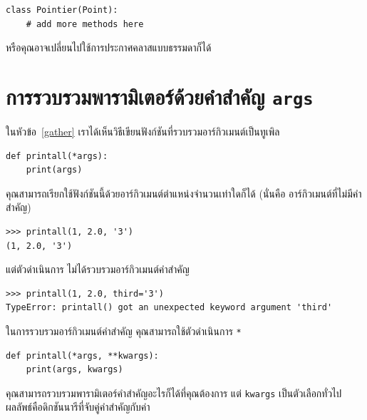 \begin{verbatim}
class Pointier(Point):
    # add more methods here
\end{verbatim}

หรือคุณอาจเปลี่ยนไปใช้การประกาศคลาสแบบธรรมดาก็ได้

\section{การรวบรวมพารามิเตอร์ด้วยคำสำคัญ \texttt{args}} %


ในหัวข้อ~\ref{gather} เราได้เห็นวิธีเขียนฟังก์ชันที่รวบรวมอาร์กิวเมนต์เป็นทูเพิล

\begin{verbatim}
def printall(*args):
    print(args)
\end{verbatim}
%
คุณสามารถเรียกใช้ฟังก์ชันนี้ด้วยอาร์กิวเมนต์ตำแหน่งจำนวนเท่าใดก็ได้ (นั่นคือ อาร์กิวเมนต์ที่ไม่มีคำสำคัญ)

\begin{verbatim}
>>> printall(1, 2.0, '3')
(1, 2.0, '3')
\end{verbatim}
%
แต่ตัวดำเนินการ {\tt *} ไม่ได้รวบรวมอาร์กิวเมนต์คำสำคัญ

\begin{verbatim}
>>> printall(1, 2.0, third='3')
TypeError: printall() got an unexpected keyword argument 'third'
\end{verbatim}
%
ในการรวบรวมอาร์กิวเมนต์คำสำคัญ คุณสามารถใช้ตัวดำเนินการ {\tt **}

\begin{verbatim}
def printall(*args, **kwargs):
    print(args, kwargs)
\end{verbatim}
%
คุณสามารถรวบรวมพารามิเตอร์คำสำคัญอะไรก็ได้ที่คุณต้องการ แต่ {\tt kwargs} เป็นตัวเลือกทั่วไป ผลลัพธ์คือดิกชันนารีที่จับคู่คำสำคัญกับค่า

